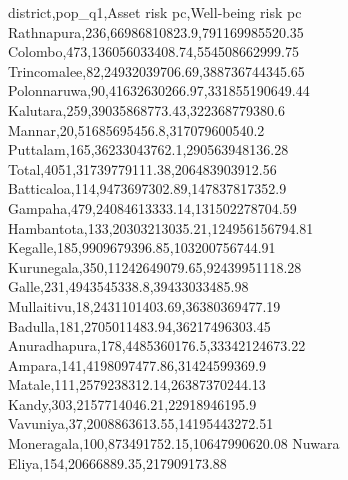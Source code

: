district,pop_q1,Asset risk pc,Well-being risk pc
Rathnapura,236,66986810823.9,791169985520.35
Colombo,473,136056033408.74,554508662999.75
Trincomalee,82,24932039706.69,388736744345.65
Polonnaruwa,90,41632630266.97,331855190649.44
Kalutara,259,39035868773.43,322368779380.6
Mannar,20,51685695456.8,317079600540.2
Puttalam,165,36233043762.1,290563948136.28
Total,4051,31739779111.38,206483903912.56
Batticaloa,114,9473697302.89,147837817352.9
Gampaha,479,24084613333.14,131502278704.59
Hambantota,133,20303213035.21,124956156794.81
Kegalle,185,9909679396.85,103200756744.91
Kurunegala,350,11242649079.65,92439951118.28
Galle,231,4943545338.8,39433033485.98
Mullaitivu,18,2431101403.69,36380369477.19
Badulla,181,2705011483.94,36217496303.45
Anuradhapura,178,4485360176.5,33342124673.22
Ampara,141,4198097477.86,31424599369.9
Matale,111,2579238312.14,26387370244.13
Kandy,303,2157714046.21,22918946195.9
Vavuniya,37,2008863613.55,14195443272.51
Moneragala,100,873491752.15,10647990620.08
Nuwara Eliya,154,20666889.35,217909173.88
